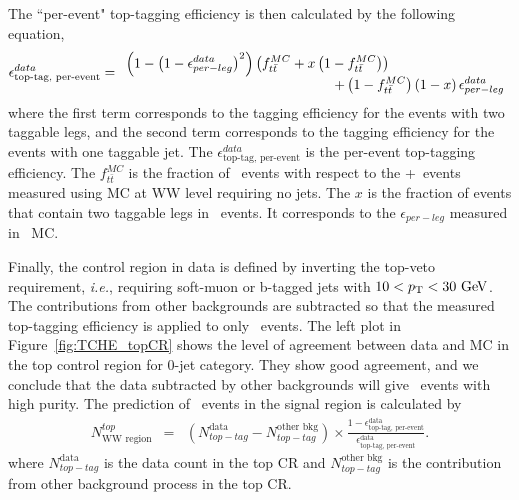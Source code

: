 The ``per-event" top-tagging efficiency is then calculated by the following equation, 
\begin{eqnarray} 
\label{eq:TopTagEff0jet}
\epsilon_{\textrm{top-tag, per-event}}^{data} 
= 
\begin{array}{ccc} \multicolumn{2}{c}{\displaystyle 
\left(1-\left(1-\epsilon_{per-leg}^{data}\right)^2\right) 
\left(f_{t\bar{t}}^{MC} + x\left(1-f_{t\bar{t}}^{MC}\right) \right)
} & \\ & \multicolumn{2}{c}{\hspace{5cm} \displaystyle
+ \left(1-f_{t\bar{t}}^{MC}\right)\left(1-x\right)\epsilon_{per-leg}^{data}
} \end{array}   
\end{eqnarray} 
where the first term corresponds to the tagging efficiency for the events with 
two taggable legs, and the second term corresponds to the tagging efficiency for 
the events with one taggable jet. 
The $\epsilon_{\textrm{top-tag, per-event}}^{data}$ is the per-event top-tagging efficiency. 
The $f_{t\bar{t}}^{MC}$ is the fraction of \ttbar\ events with respect to the 
\ttbar+\tw\ events measured using MC at WW level requiring no jets. 
The $x$ is the fraction of events that contain two taggable legs in \tw\ events. 
It corresponds to the $\epsilon_{per-leg}$ measured in \tw\ MC.  

Finally, the control region in data is defined by inverting the top-veto requirement, 
\textit{i.e.}, requiring soft-muon or b-tagged jets with $10<p_\mathrm{T}<30~\mathrm{Ge\kern -0.1em V}$.
The contributions from other backgrounds are subtracted so that the 
measured top-tagging efficiency is applied to only \topbkg\ events. 
The left plot in Figure~\ref{fig:TCHE_topCR} shows the level of agreement between 
data and MC in the top control region for 0-jet category.  
They show good agreement, and we conclude that the data subtracted by other backgrounds 
will give \topbkg\ events with high purity. 
The prediction of \topbkg\ events in the signal region is calculated by 
\begin{eqnarray} 
\label{eq:topExtrapolation0jet}
N^{top}_{\textrm{WW region}}
&=&   
(N_{top-tag}^{\textrm{data}}-N_{top-tag}^{\textrm{other bkg}}) \times
\frac{1-\epsilon_{\textrm{top-tag, per-event}}^{\textrm{data}}}
     {\epsilon_{\textrm{top-tag, per-event}}^{\textrm{data}}}.  
\end{eqnarray} 
where $N_{top-tag}^{\textrm{data}}$ is the data count in the top CR 
and $N_{top-tag}^{\textrm{other bkg}}$ is the contribution from other 
background process in the top CR.


